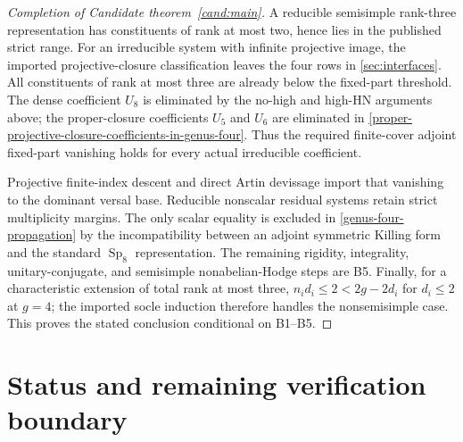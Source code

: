 \documentclass[11pt]{article}
\theoremstyle{definition}
\newcommand{\Sp}{\operatorname{Sp}}
\begin{document}
\begin{proof}[Completion of Candidate theorem~\ref{cand:main}]
A reducible semisimple rank-three representation has constituents of rank at
most two, hence lies in the published strict range.  For an irreducible
system with infinite projective image, the imported projective-closure
classification leaves the four rows in \cref{sec:interfaces}.  All
constituents of rank at most three are already below the fixed-part
threshold.  The dense coefficient $U_8$ is eliminated by the no-high and
high-HN arguments above; the proper-closure coefficients $U_5$ and $U_6$
are eliminated in
\cref{proper-projective-closure-coefficients-in-genus-four}.  Thus the
required finite-cover adjoint fixed-part vanishing holds for every actual
irreducible coefficient.

Projective finite-index descent and direct Artin devissage import that
vanishing to the dominant versal base.  Reducible nonscalar residual systems
retain strict multiplicity margins.  The only scalar equality is excluded in
\cref{genus-four-propagation} by the incompatibility between an adjoint
symmetric Killing form and the standard $\Sp_8$ representation.  The
remaining rigidity, integrality, unitary-conjugate, and semisimple
nonabelian-Hodge steps are B5.  Finally, for a characteristic extension of
total rank at most three, $n_i d_i\le2<2g-2d_i$ for $d_i\le2$ at $g=4$;
the imported socle induction therefore handles the nonsemisimple case.
This proves the stated conclusion conditional on B1--B5.
\end{proof}

\section{Status and remaining verification boundary}
\label{sec:status}
\end{document}
